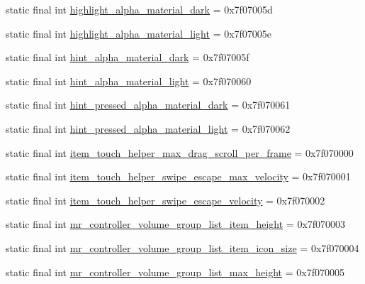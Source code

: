 \begin{CompactItemize}
\item 
static final int \hyperlink{classandroid_1_1support_1_1fragment_1_1_r_1_1dimen_cb5ec2b748cdff0784f52496cbed7376}{highlight\_\-alpha\_\-material\_\-dark} = 0x7f07005d
\item 
static final int \hyperlink{classandroid_1_1support_1_1fragment_1_1_r_1_1dimen_09676195cd600a4b8806c6fa39e10bab}{highlight\_\-alpha\_\-material\_\-light} = 0x7f07005e
\item 
static final int \hyperlink{classandroid_1_1support_1_1fragment_1_1_r_1_1dimen_4bca227f2522e5ca1d362f9764623714}{hint\_\-alpha\_\-material\_\-dark} = 0x7f07005f
\item 
static final int \hyperlink{classandroid_1_1support_1_1fragment_1_1_r_1_1dimen_c2613bdefa8f16ac678600cb9867614e}{hint\_\-alpha\_\-material\_\-light} = 0x7f070060
\item 
static final int \hyperlink{classandroid_1_1support_1_1fragment_1_1_r_1_1dimen_93d97aa6d269ebd04157f531312bf2cb}{hint\_\-pressed\_\-alpha\_\-material\_\-dark} = 0x7f070061
\item 
static final int \hyperlink{classandroid_1_1support_1_1fragment_1_1_r_1_1dimen_a4131deffe7b754fefd98f6481639d0e}{hint\_\-pressed\_\-alpha\_\-material\_\-light} = 0x7f070062
\item 
static final int \hyperlink{classandroid_1_1support_1_1fragment_1_1_r_1_1dimen_347816a3f0ffe486a35df9090ca58f74}{item\_\-touch\_\-helper\_\-max\_\-drag\_\-scroll\_\-per\_\-frame} = 0x7f070000
\item 
static final int \hyperlink{classandroid_1_1support_1_1fragment_1_1_r_1_1dimen_2428548e2a8de093e4c8f8d1119763ec}{item\_\-touch\_\-helper\_\-swipe\_\-escape\_\-max\_\-velocity} = 0x7f070001
\item 
static final int \hyperlink{classandroid_1_1support_1_1fragment_1_1_r_1_1dimen_25c56bd22f9bb8a51f088e0399544c47}{item\_\-touch\_\-helper\_\-swipe\_\-escape\_\-velocity} = 0x7f070002
\item 
static final int \hyperlink{classandroid_1_1support_1_1fragment_1_1_r_1_1dimen_b00d54941dbfb8fff82b0ae500d10c6a}{mr\_\-controller\_\-volume\_\-group\_\-list\_\-item\_\-height} = 0x7f070003
\item 
static final int \hyperlink{classandroid_1_1support_1_1fragment_1_1_r_1_1dimen_9739bc481cd19d1a1e4cd6c493cca4c9}{mr\_\-controller\_\-volume\_\-group\_\-list\_\-item\_\-icon\_\-size} = 0x7f070004
\item 
static final int \hyperlink{classandroid_1_1support_1_1fragment_1_1_r_1_1dimen_5f2fcf8d6060a707f3eac07b9e9efec0}{mr\_\-controller\_\-volume\_\-group\_\-list\_\-max\_\-height} = 0x7f070005

\end{CompactItemize}

